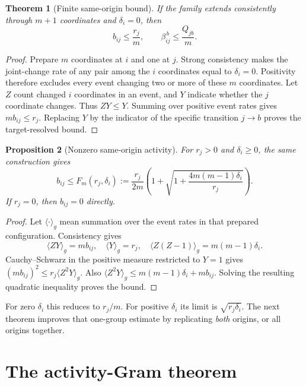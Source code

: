 \documentclass[11pt,a4paper]{article}
\newtheorem{theorem}{Theorem}
\newtheorem{proposition}[theorem]{Proposition}
\begin{document}
\begin{theorem}[Finite same-origin bound]
If the family extends consistently through $m+1$ coordinates and
$\delta_i=0$, then
\[
 b_{ij}\le\frac{r_j}{m},\qquad
 \beta_{ij}^{\,b}\le\frac{Q_{jb}}{m}.
\]
\end{theorem}
\begin{proof}
Prepare $m$ coordinates at $i$ and one at $j$. Strong consistency makes
the joint-change rate of any pair among the $i$ coordinates equal to
$\delta_i=0$. Positivity therefore excludes every event changing two or
more of these $m$ coordinates. Let $Z$ count changed $i$ coordinates in an
event, and $Y$ indicate whether the $j$ coordinate changes. Thus $ZY\le Y$.
Summing over positive event rates gives
$m b_{ij}\le r_j$. Replacing $Y$ by the indicator of the specific
transition $j\to b$ proves the target-resolved bound.
\end{proof}

\begin{proposition}[Nonzero same-origin activity]
For $r_j>0$ and $\delta_i\ge0$, the same construction gives
\[
 b_{ij}\le F_m(r_j,\delta_i)
 :=\frac{r_j}{2m}\left(1+
 \sqrt{1+\frac{4m(m-1)\delta_i}{r_j}}\right).
\]
If $r_j=0$, then $b_{ij}=0$ directly.
\end{proposition}
\begin{proof}
Let $\langle\cdot\rangle_g$ mean summation over the event rates in that
prepared configuration. Consistency gives
\[
 \langle ZY\rangle_g=m b_{ij},\quad
 \langle Y\rangle_g=r_j,\quad
 \langle Z(Z-1)\rangle_g=m(m-1)\delta_i.
\]
Cauchy--Schwarz in the positive measure restricted to $Y=1$ gives
$(m b_{ij})^2\le r_j\langle Z^2Y\rangle_g$.
Also $\langle Z^2Y\rangle_g\le m(m-1)\delta_i+m b_{ij}$.
Solving the resulting quadratic inequality proves the bound.
\end{proof}

For zero $\delta_i$ this reduces to $r_j/m$. For positive $\delta_i$
its limit is $\sqrt{r_j\delta_i}$. The next theorem improves that
one-group estimate by replicating \emph{both} origins, or all origins
together.

\section{The activity-Gram theorem}
\end{document}
